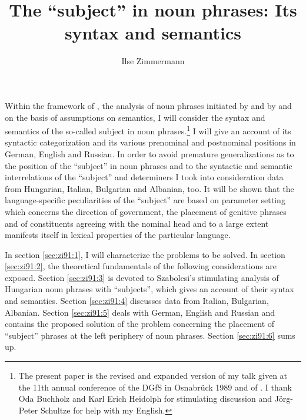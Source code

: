\documentclass[output=paper,colorlinks,citecolor=brown]{langscibook}
\author{Ilse Zimmermann\affiliation{Zentralinstitut für Sprachwissenschaft}}
\title{The “subject” in noun phrases: Its syntax and semantics}
\begin{document}
\maketitle


 \noindent Within the framework of \citet{Chomsky86Barriers}, the analysis of noun phrases initiated by \citet{Szabolosi81The-possessive-Hungarian, Szabolosi83Possessor-ran-away, Szabolosi87Functional-categories} and by \citet{Abney86Functional-elements, Abney87The-English} and on the basis of  assumptions on semantics, I will consider the syntax and semantics of the so-called subject in noun phrases.\footnote{The present paper is the revised and expanded version of my talk given at the 11th annual conference of the DGfS in Osnabrück 1989 and of \citet{Zimmermann89The-subject}. I thank Oda Buchholz and Karl Erich Heidolph for stimulating discussion and Jörg-Peter Schultze for help with my
English.} I will give an account of its syntactic categorization and its various prenominal and postnominal positions in German, English and Russian. In order to avoid premature generalizations as to the position of the “subject” in noun phrases and to the syntactic and semantic interrelations of the “subject” and determiners I took into consideration data from Hungarian, Italian, Bulgarian and Albanian, too. It will be shown that the language-specific peculiarities of the “subject” are based on parameter setting which concerns the direction of government, the placement of genitive phrases and of constituents agreeing with the nominal head and to a large extent manifests itself in lexical properties of the particular language.

In section \ref{sec:zi91:1}, I will characterize the problems to be solved. In section \ref{sec:zi91:2}, the theoretical fundamentals of the following considerations are exposed. Section \ref{sec:zi91:3} is devoted to Szabolcsi's stimulating analysis of Hungarian noun phrases with “subjects”, which gives an account of their syntax and semantics. Section \ref{sec:zi91:4} discusses data from Italian, Bulgarian, Albanian. Section \ref{sec:zi91:5} deals with German, English and Russian and contains the proposed solution of the problem concerning the placement of “subject” phrases at the left periphery of noun phrases. Section \ref{sec:zi91:6} sums up.
\end{document}
